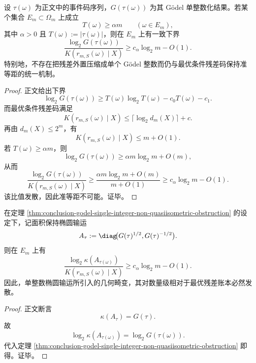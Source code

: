 \begin{theorem}\label{thm:conclusion-godel-single-integer-non-quasiisometric-obstruction}
设 \(\tau(\omega)\) 为正文中的事件码序列，\(G(\tau(\omega))\) 为其 Gödel 单整数化结果。若某个集合 \(E_m\subset\Omega_m\) 上成立
\[
T(\omega)\ge \alpha m
\qquad (\omega\in E_m),
\]
其中 \(\alpha>0\) 且 \(T(\omega):=|\tau(\omega)|\)，则在 \(E_m\) 上有一致下界
\[
\frac{\log_2 G(\tau(\omega))}{K(r_{m,S}(\omega)\mid X)}
\ge
c_\alpha \log_2 m-O(1).
\]
特别地，不存在把残差外置压缩成单个 Gödel 整数而仍与最优条件残差码保持准等距的统一机制。
\end{theorem}
\begin{proof}
正文给出下界
\[
\log_2 G(\tau(\omega))
\ge
T(\omega)\log_2 T(\omega)-c_0T(\omega)-c_1.
\]
而最优条件残差码满足
\[
K(r_{m,S}(\omega)\mid X)\le \lceil \log_2 d_m(X)\rceil+c.
\]
再由 \(d_m(X)\le 2^m\)，有
\[
K(r_{m,S}(\omega)\mid X)\le m+O(1).
\]
若 \(T(\omega)\ge \alpha m\)，则
\[
\log_2 G(\tau(\omega))
\ge
\alpha m\log_2 m+O(m),
\]
从而
\[
\frac{\log_2 G(\tau(\omega))}{K(r_{m,S}(\omega)\mid X)}
\ge
\frac{\alpha m\log_2 m+O(m)}{m+O(1)}
\ge
c_\alpha \log_2 m-O(1).
\]
该比值发散，因此准等距不可能。证毕。
\end{proof}

\begin{corollary}[椭圆输运条件数相对于最优账本的对数发散]\label{cor:conclusion-elliptic-transport-condition-number-log-divergence}
在定理 \ref{thm:conclusion-godel-single-integer-non-quasiisometric-obstruction} 的设定下，记面积保持椭圆输运
\[
A_{\tau}:=\diag\!\bigl(G(\tau)^{1/2},G(\tau)^{-1/2}\bigr).
\]
则在 \(E_m\) 上有
\[
\frac{\log_2 \kappa(A_{\tau(\omega)})}{K(r_{m,S}(\omega)\mid X)}
\ge
c_\alpha \log_2 m-O(1).
\]
因此，单整数椭圆输运所引入的几何畸变，其对数量级相对于最优残差账本必然发散。
\end{corollary}
\begin{proof}
正文断言
\[
\kappa(A_\tau)=G(\tau).
\]
故
\[
\log_2 \kappa(A_{\tau(\omega)})=\log_2 G(\tau(\omega)).
\]
代入定理 \ref{thm:conclusion-godel-single-integer-non-quasiisometric-obstruction} 即得。证毕。
\end{proof}


